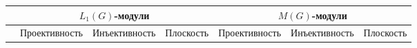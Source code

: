 \begin{scriptsize}
\begin{longtable}{|c|c|c|c|c|c|c|}
\hline            & \multicolumn{3}{c|}{$L_1(G)$-модули}                                                                                                                                                                                                                                                                                                                                                                                                                                                                 & \multicolumn{3}{c|}{$M(G)$-модули}                                                                                                                                                                                                                                                                                                                                                                                                                                                                  \\
\hline
                  & Проективность                                                                                                                                               & Инъективность                                                                                                                                                & Плоскость                                                                                                                                                    & Проективность                                                                                                                                               & Инъективность                                                                                                                                                & Плоскость                                                                                                                                                   \\ 
\hline

\end{longtable}
\end{scriptsize}
